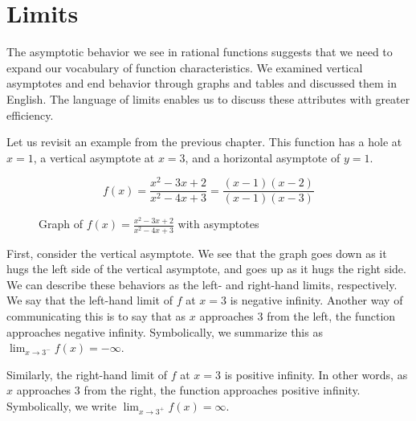 	\chapter{Limits}

The asymptotic behavior we see in rational functions suggests that we need to 
expand our vocabulary of function characteristics. We examined vertical asymptotes 
and end behavior through graphs and tables and discussed them in English. The 
language of limits enables us to discuss these attributes with greater efficiency. 

Let us revisit an example from the previous chapter. This function has a hole at 
$ x = 1 $, a vertical asymptote at $ x = 3 $, and a horizontal asymptote of 
$ y = 1 $.

$$ f(x) = \frac{x^2 - 3x + 2}{x^2 - 4x + 3} = \frac{(x-1)(x-2)}{(x-1)(x-3)} $$

\begin{figure}[htbp]
  \centering
  \caption{Graph of \( f(x) = \frac{x^2 - 3x + 2}{x^2 - 4x + 3} \) with asymptotes}
\end{figure}

First, consider the vertical asymptote. We see that the graph goes down as it hugs 
the left side of the vertical asymptote, and goes up as it hugs the right side. We 
can describe these behaviors as the left- and right-hand limits, respectively. We 
say that the left-hand limit of $ f $ at $ x = 3 $ is negative infinity. Another 
way of communicating this is to say that as $ x $ approaches $ 3 $ from the left, 
the function approaches negative infinity. Symbolically, we summarize this as 
$ \lim_{x \rightarrow 3^-} f(x) = -\infty $.

Similarly, the right-hand limit of $ f $ at $ x = 3 $ is positive infinity. In 
other words, as $ x $ approaches $ 3 $ from the right, the function approaches 
positive infinity. Symbolically, we write $ \lim_{x \rightarrow 3^+} f(x) = \infty $.

